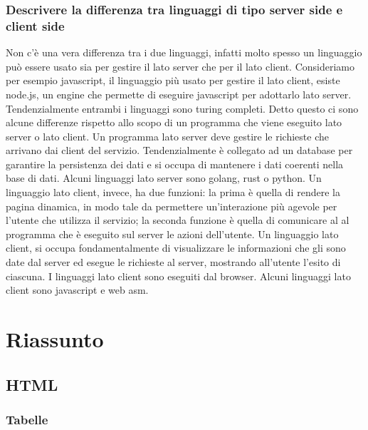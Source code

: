 \documentclass[12pt]{article}
\begin{document}
\subsubsection{Descrivere la differenza tra linguaggi di tipo server side e
	client side}

Non c'è una vera differenza tra i due linguaggi, infatti molto spesso un
linguaggio può essere usato sia per gestire il lato server che per il lato
client. Consideriamo per esempio javascript, il linguaggio più usato per gestire
il lato client, esiste node.js, un engine che permette di eseguire javascript
per adottarlo lato server. Tendenzialmente entrambi i linguaggi sono turing
completi. Detto questo ci sono alcune differenze rispetto allo scopo di un
programma che viene eseguito lato server o lato client.
Un programma lato server deve gestire le richieste che arrivano dai client del
servizio. Tendenzialmente è collegato ad un database per garantire la
persistenza dei dati e si occupa di mantenere i dati coerenti nella base di
dati. Alcuni linguaggi lato server sono golang, rust o python.
Un linguaggio lato client, invece, ha due funzioni: la prima è quella di rendere
la pagina dinamica, in modo tale da permettere un'interazione più agevole per
l'utente che utilizza il servizio; la seconda funzione è quella di comunicare al
al programma che è eseguito sul server le azioni dell'utente. Un linguaggio lato
client, si occupa fondamentalmente di visualizzare le informazioni che gli sono
date dal server ed esegue le richieste al server, mostrando all'utente l'esito
di ciascuna. I linguaggi lato client sono eseguiti dal browser. Alcuni linguaggi
lato client sono javascript e web asm.




\section{Riassunto}

\subsection{HTML}

\subsubsection{Tabelle}
\end{document}
